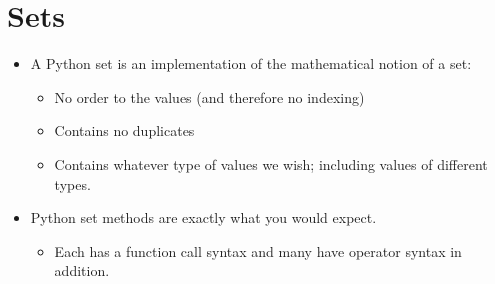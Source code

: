 \documentclass[letterpaper,10pt,english]{sphinxmanual}
\begin{document}
\section{Sets}
\label{\detokenize{lecture_notes/lec15_sets:sets}}\begin{itemize}
\item {} 
A Python set is an implementation of the mathematical notion of a
set:
\begin{itemize}
\item {} 
No order to the values (and therefore no indexing)

\item {} 
Contains no duplicates

\item {} 
Contains whatever type of values we wish; including values of
different types.

\end{itemize}

\item {} 
Python set methods are exactly what you would expect.
\begin{itemize}
\item {} 
Each has a function call syntax and many have operator syntax in
addition.

\end{itemize}

\end{itemize}
\end{document}
